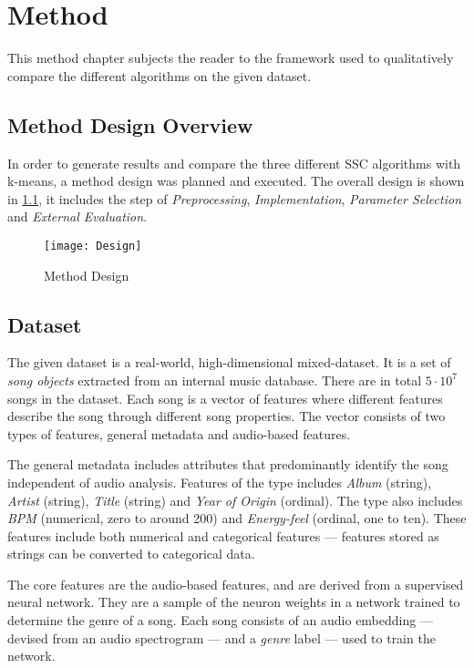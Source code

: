 \documentclass[../report.tex]{subfiles}
\begin{document}
 \chapter{Method} This method chapter subjects the reader to the framework used to qualitatively compare the different algorithms on the given dataset.

\section{Method Design Overview}
In order to generate results and compare the three different SSC algorithms with k-means, a method design was planned and executed. The overall design is shown in \cref{fig:method}, it includes the step of \textit{Preprocessing}, \textit{Implementation}, \textit{Parameter Selection} and \textit{External Evaluation}.

\begin{figure}[h]
  \begin{center}
    \texttt{[image: Design]}
  \end{center}
  \caption{Method Design}\label{fig:method}
\end{figure}
\section{Dataset}
\label{sec:dataset}
The given dataset is a real-world, high-dimensional mixed-dataset. It is a set of \textit{song objects} extracted from an internal music database. There are in total $5\cdot10^7$ songs in the dataset. Each song is a vector of features where different features describe the song through different song properties. The vector consists of two types of features, general metadata and audio-based features.

The general metadata includes attributes that predominantly identify the song independent of audio analysis. Features of the type includes \textit{Album} (string), \textit{Artist} (string), \textit{Title} (string) and \textit{Year of Origin} (ordinal). The type also includes \textit{BPM} (numerical, zero to around 200) and \textit{Energy-feel} (ordinal, one to ten). These features include both numerical and categorical features --- features stored as strings can be converted to categorical data.

The core features are the audio-based features, and are derived from a supervised neural network. They are a sample of the neuron weights in a network trained to determine the genre of a song. Each song consists of an audio embedding --- devised from an audio spectrogram --- and a \textit{genre} label --- used to train the network.
\end{document}

